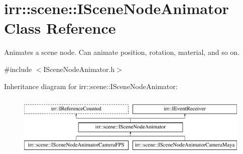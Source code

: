 \hypertarget{classirr_1_1scene_1_1ISceneNodeAnimator}{}\section{irr\+:\+:scene\+:\+:I\+Scene\+Node\+Animator Class Reference}
\label{classirr_1_1scene_1_1ISceneNodeAnimator}


Animates a scene node. Can animate position, rotation, material, and so on.  




{\ttfamily \#include $<$I\+Scene\+Node\+Animator.\+h$>$}

Inheritance diagram for irr\+:\+:scene\+:\+:I\+Scene\+Node\+Animator\+:\begin{figure}[H]
\begin{center}
\leavevmode
\includegraphics[height=3.000000cm]{classirr_1_1scene_1_1ISceneNodeAnimator}
\end{center}
\end{figure}
